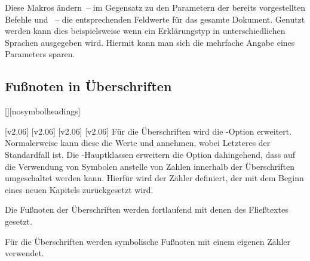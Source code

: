 \begin{Declaration}{}
\begin{Declaration}{}
\begin{Declaration}{}
\begin{Declaration}{}
\printdeclarationlist%
%
%
Diese Makros ändern~-- im Gegensatz zu den Parametern der bereits vorgestellten 
Befehle  und ~-- die entsprechenden 
Feldwerte für das gesamte Dokument. Genutzt werden kann dies beispielsweise 
wenn ein Erklärungstyp in unterschiedlichen Sprachen ausgegeben wird. Hiermit 
kann man sich die mehrfache Angabe eines Parameters sparen.
\end{Declaration}
\end{Declaration}
\end{Declaration}
\end{Declaration}


\subsection{Fußnoten in Überschriften}
\begin{Declaration}{[\PSet]}[nosymbolheadings]%
\begin{Declaration}[v2.02]{}%
\printdeclarationlist%
%
%
[v2.06]
[v2.06]
[v2.06]
[v2.06]
Für die Überschriften wird die \KOMAScript-Option  erweitert.
Normalerweise kann diese die Werte  und  
annehmen, wobei Letzteres der Standardfall ist. Die \TUDScript-Hauptklassen 
erweitern die Option dahingehend, dass auf die Verwendung von Symbolen anstelle 
von Zahlen innerhalb der Überschriften umgeschaltet werden kann. Hierfür wird 
der Zähler  definiert, der mit dem Beginn eines neuen 
Kapitels zurückgesetzt wird.
%
\begin{values}
\item[nosymbolheadings/numberheadings]
  Die Fußnoten der Überschriften werden fortlaufend mit denen des Fließtextes 
  gesetzt.
\item[symbolheadings]
  Für die Überschriften werden symbolische Fußnoten mit einem eigenen Zähler 
  verwendet.
\end{values}
\end{Declaration}
\end{Declaration}


